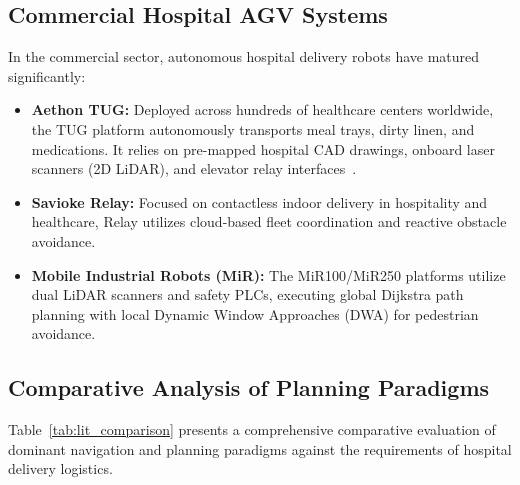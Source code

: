 \documentclass[12pt,a4paper]{article}
\begin{document}
\subsection{Commercial Hospital AGV Systems}
In the commercial sector, autonomous hospital delivery robots have matured significantly:
\begin{itemize}[itemsep=2pt,topsep=2pt]
\item \textbf{Aethon TUG:} Deployed across hundreds of healthcare centers worldwide, the TUG platform autonomously transports meal trays, dirty linen, and medications. It relies on pre-mapped hospital CAD drawings, onboard laser scanners (2D LiDAR), and elevator relay interfaces~\cite{rohde2019}.
\item \textbf{Savioke Relay:} Focused on contactless indoor delivery in hospitality and healthcare, Relay utilizes cloud-based fleet coordination and reactive obstacle avoidance.
\item \textbf{Mobile Industrial Robots (MiR):} The MiR100/MiR250 platforms utilize dual LiDAR scanners and safety PLCs, executing global Dijkstra path planning with local Dynamic Window Approaches (DWA) for pedestrian avoidance.
\end{itemize}

\subsection{Comparative Analysis of Planning Paradigms}
Table~\ref{tab:lit_comparison} presents a comprehensive comparative evaluation of dominant navigation and planning paradigms against the requirements of hospital delivery logistics.
\end{document}
